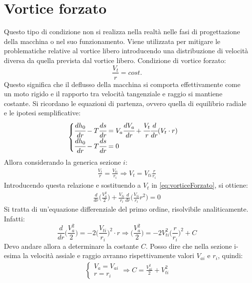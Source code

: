 \section{Vortice forzato}
Questo tipo di condizione non si realizza nella realtà nelle fasi di progettazione della macchina o nel suo funzionamento. Viene utilizzata per mitigare le problematiche relative al vortice libero introducendo una distribuzione di velocità diversa da quella prevista dal vortice libero. Condizione di vortice forzato:
\begin{equation}
\boxed{\frac{V_t}{r} = cost.}
\label{eq:VortForz}
\end{equation}
Questo significa che il deflusso della macchina si comporta effettivamente come un moto rigido e il rapporto tra velocità tangenziale e raggio si mantiene costante.
Si ricordano le equazioni di partenza, ovvero quella di equilibrio radiale e le ipotesi semplificative:
\begin{equation}
\begin{cases}
\cfrac{dh_0}{dr} - T\cfrac{ds}{dr} = V_a \cfrac{dV_a}{dr} + \cfrac{V_t}{r} \cfrac{d}{dr}(V_t \cdot r)\\
\cfrac{dh_0}{dr} - T\cfrac{ds}{dr} = 0
\end{cases}
\label{eq:vorticeForzato}
\end{equation}
Allora considerando la generica sezione $i$:
\begin{align*}
\frac{V_t}{r} = \frac{V_{ti}}{r_i} \Rightarrow V_t = V_{ti} \frac{r}{r_i}
\end{align*}
Introducendo questa relazione e sostituendo a $V_{t}$ in \ref{eq:vorticeForzato}, si ottiene:
\begin{align*}
\frac{d}{dr}\bigg( \frac{V_a^2}{2} \bigg) + \frac{V_{ti}}{r_i} \frac{d}{dr} \bigg(\frac{V_{ti}}{r_i} r^2 \bigg) = 0
\end{align*}
Si tratta di un'equazione differenziale del primo ordine, risolvibile analiticamente. Infatti:
\begin{equation}
\frac{d}{dr} \bigg( \frac{V_a^2}{2} \bigg) = -2 \bigg( \frac{V_{ti}}{r_i} \bigg) ^2 \cdot r
\Rightarrow
\bigg( \frac{V_a^2}{2} \bigg) = -2 V_{ti}^2 \bigg(\frac{r}{r_i} \bigg)^2 +C
\label{eq:SolCost}
\end{equation}
Devo andare allora a determinare la costante $C$. Posso dire che nella sezione i-esima la velocità assiale e raggio avranno rispettivamente valori $V_{ai}$ e $r_i$, quindi:
\begin{align*}
\begin{cases}
V_a=V_{ai}\\
r=r_i
\end{cases}
\Rightarrow
C = \frac{V_{ai}^2}{2} + V_{ti}^2
\end{align*}
